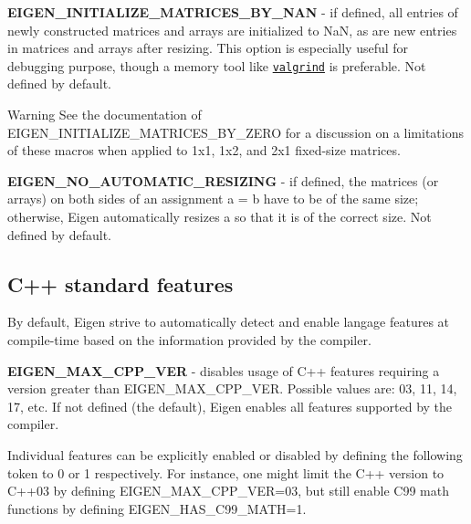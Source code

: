\begin{DoxyItemize}
\item {\bfseries E\+I\+G\+E\+N\+\_\+\+I\+N\+I\+T\+I\+A\+L\+I\+Z\+E\+\_\+\+M\+A\+T\+R\+I\+C\+E\+S\+\_\+\+B\+Y\+\_\+\+N\+AN} -\/ if defined, all entries of newly constructed matrices and arrays are initialized to NaN, as are new entries in matrices and arrays after resizing. This option is especially useful for debugging purpose, though a memory tool like \href{http://valgrind.org/}{\tt valgrind} is preferable. Not defined by default. \begin{DoxyWarning}{Warning}
See the documentation of {\ttfamily E\+I\+G\+E\+N\+\_\+\+I\+N\+I\+T\+I\+A\+L\+I\+Z\+E\+\_\+\+M\+A\+T\+R\+I\+C\+E\+S\+\_\+\+B\+Y\+\_\+\+Z\+E\+RO} for a discussion on a limitations of these macros when applied to {\ttfamily 1x1}, {\ttfamily 1x2}, and {\ttfamily 2x1} fixed-\/size matrices.
\end{DoxyWarning}

\item {\bfseries E\+I\+G\+E\+N\+\_\+\+N\+O\+\_\+\+A\+U\+T\+O\+M\+A\+T\+I\+C\+\_\+\+R\+E\+S\+I\+Z\+I\+NG} -\/ if defined, the matrices (or arrays) on both sides of an assignment {\ttfamily a = b} have to be of the same size; otherwise, Eigen automatically resizes {\ttfamily a} so that it is of the correct size. Not defined by default.
\end{DoxyItemize}\hypertarget{_topic_preprocessor_directives_TopicPreprocessorDirectivesCppVersion}{}\subsection{C++ standard features}\label{_topic_preprocessor_directives_TopicPreprocessorDirectivesCppVersion}
By default, Eigen strive to automatically detect and enable langage features at compile-\/time based on the information provided by the compiler.


\begin{DoxyItemize}
\item {\bfseries E\+I\+G\+E\+N\+\_\+\+M\+A\+X\+\_\+\+C\+P\+P\+\_\+\+V\+ER} -\/ disables usage of C++ features requiring a version greater than E\+I\+G\+E\+N\+\_\+\+M\+A\+X\+\_\+\+C\+P\+P\+\_\+\+V\+ER. Possible values are\+: 03, 11, 14, 17, etc. If not defined (the default), Eigen enables all features supported by the compiler.
\end{DoxyItemize}

Individual features can be explicitly enabled or disabled by defining the following token to 0 or 1 respectively. For instance, one might limit the C++ version to C++03 by defining E\+I\+G\+E\+N\+\_\+\+M\+A\+X\+\_\+\+C\+P\+P\+\_\+\+V\+ER=03, but still enable C99 math functions by defining E\+I\+G\+E\+N\+\_\+\+H\+A\+S\+\_\+\+C99\+\_\+\+M\+A\+TH=1.


